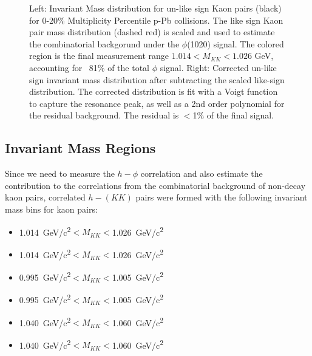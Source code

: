 \documentclass[ALICE,manyauthors]{ALICE_analysis_notes}
\begin{document}
 \begin{figure}[ht]
\centering
\begin{subfigure}{
\texttt{[image: images/narrowmass\_invmass.pdf]}}
\end{subfigure}
\begin{subfigure}{
\texttt{[image: images/corrected\_invmass.pdf]}}
\end{subfigure}
\caption{Left: Invariant Mass distribution for un-like sign Kaon pairs (black) for 0-20\% Multiplicity Percentile p-Pb collisions.  The like sign Kaon pair mass distribution (dashed red) is scaled and used to estimate the combinatorial backgorund under the $\phi$(1020) signal.  The colored region is the final measurement range $1.014 < M_{KK} < 1.026$ GeV, accounting for ~81\% of the total $\phi$ signal.  Right: Corrected un-like sign invariant mass distribution after subtracting the scaled like-sign distribution.  The corrected distribution is fit with a Voigt function to capture the resonance peak, as well as a 2nd order polynomial for the residual background. The residual is $<$1\% of the final signal.}
\label{rawinvmass}
\end{figure}
 
 \subsection{Invariant Mass Regions}
 Since we need to measure the $h-\phi$ correlation and also estimate the contribution to the correlations from the combinatorial background of non-decay kaon pairs, correlated $h-(KK)$ pairs were formed with the following invariant mass bins for kaon pairs:

\begin{itemize}
	\item {}  \SI{1.014}{GeV/c^2}$< M_{KK} < $\SI{1.026}{GeV/c^2}
	\item  {}  \SI{1.014}{GeV/c^2}$< M_{KK} < $\SI{1.026}{GeV/c^2}
	\item  {}  \SI{0.995}{GeV/c^2}$< M_{KK} < $\SI{1.005}{GeV/c^2}
	\item  {} \SI{0.995}{GeV/c^2}$< M_{KK} < $\SI{1.005}{GeV/c^2}
	\item  {} \SI{1.040}{GeV/c^2}$< M_{KK} < $\SI{1.060}{GeV/c^2}
	\item  {} \SI{1.040}{GeV/c^2}$< M_{KK} < $\SI{1.060}{GeV/c^2}
\end{itemize}
\end{document}
